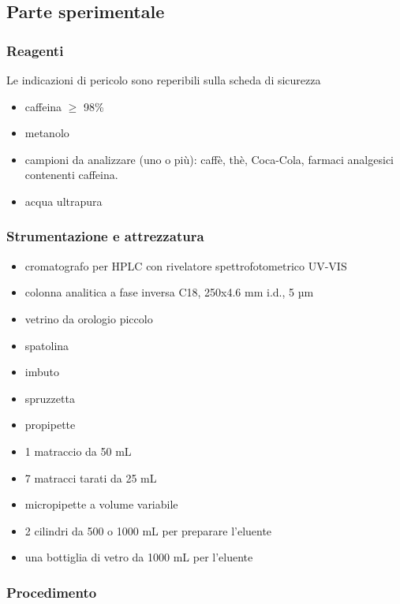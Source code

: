 \subsection{Parte sperimentale}

\subsubsection{Reagenti}
Le indicazioni di pericolo sono reperibili sulla scheda di sicurezza
\begin{itemize}
\item caffeina $\geq$ 98\%
\item metanolo
\item campioni da analizzare (uno o più): caffè, thè, Coca-Cola, farmaci analgesici contenenti caffeina.
\item acqua ultrapura
\end{itemize}

\subsubsection{Strumentazione e attrezzatura}
\begin{itemize}
\item cromatografo per HPLC con rivelatore spettrofotometrico UV-VIS
\item colonna analitica a fase inversa C18, 250x4.6 mm i.d., 5 µm
\item vetrino da orologio piccolo
\item spatolina
\item imbuto
\item spruzzetta
\item propipette
\item 1 matraccio da 50 mL
\item 7 matracci tarati da 25 mL
\item micropipette a volume variabile
\item 2 cilindri da 500 o 1000 mL per preparare l'eluente
\item una bottiglia di vetro da 1000 mL per l'eluente
\end{itemize}

\subsubsection{Procedimento}

